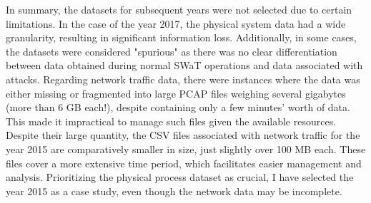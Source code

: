 \bigskip
In summary, the datasets for subsequent years were not selected due to certain limitations. In the case of the year 2017, the physical system data had a wide granularity, resulting in significant information loss. Additionally, in some cases, the datasets were considered "spurious" as there was no clear differentiation between data obtained during normal SWaT operations and data associated with attacks.\newline
Regarding network traffic data, there were instances where the data was either missing or fragmented into large PCAP files weighing several gigabytes (more than 6 GB each!), despite containing only a few minutes' worth of data. This made it impractical to manage such files given the available resources.\newline
Despite their large quantity, the CSV files associated with network traffic for the year 2015 are comparatively smaller in size, just slightly over 100 MB each. These files cover a more extensive time period, which facilitates easier management and analysis. Prioritizing the physical process dataset as crucial, I have selected the year 2015 as a case study, even though the network data may be incomplete.

\vfill
\nolinenumbers